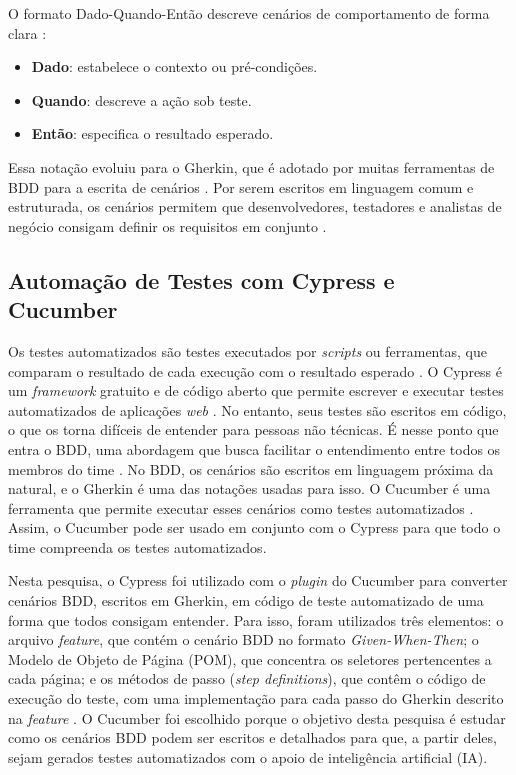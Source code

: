 O formato Dado-Quando-Então descreve cenários de comportamento de forma clara \cite{smart2014bdd}:

\begin{itemize}
    \item \textbf{Dado}: estabelece o contexto ou pré-condições.
    \item \textbf{Quando}: descreve a ação sob teste.
    \item \textbf{Então}: especifica o resultado esperado.
\end{itemize}

Essa notação evoluiu para o Gherkin, que é adotado por muitas ferramentas de BDD para a escrita de cenários \cite{smart2014bdd}. Por serem escritos em linguagem comum e estruturada, os cenários permitem que desenvolvedores, testadores e analistas de negócio consigam definir os requisitos em conjunto \cite{smart2014bdd}.

\subsection{Automação de Testes com Cypress e Cucumber}

Os testes automatizados são testes executados por \textit{scripts} ou ferramentas, que comparam o resultado de cada execução com o resultado esperado \cite{iso29119_1_2022}. O Cypress é um \textit{framework} gratuito e de código aberto que permite escrever e executar testes automatizados de aplicações \textit{web} \cite{cypressdocs}. No entanto, seus testes são escritos em código, o que os torna difíceis de entender para pessoas não técnicas. É nesse ponto que entra o BDD, uma abordagem que busca facilitar o entendimento entre todos os membros do time \cite{smart2014bdd}. No BDD, os cenários são escritos em linguagem próxima da natural, e o Gherkin é uma das notações usadas para isso. O Cucumber é uma ferramenta que permite executar esses cenários como testes automatizados \cite{cucumberdocs}. Assim, o Cucumber pode ser usado em conjunto com o Cypress para que todo o time compreenda os testes automatizados.

Nesta pesquisa, o Cypress foi utilizado com o \textit{plugin} do Cucumber para converter cenários BDD, escritos em Gherkin, em código de teste automatizado de uma forma que todos consigam entender. Para isso, foram utilizados três elementos: o arquivo \textit{feature}, que contém o cenário BDD no formato \textit{Given-When-Then}; o Modelo de Objeto de Página (POM), que concentra os seletores pertencentes a cada página; e os métodos de passo (\textit{step definitions}), que contêm o código de execução do teste, com uma implementação para cada passo do Gherkin descrito na \textit{feature} \cite{Nettur2025}. O Cucumber foi escolhido porque o objetivo desta pesquisa é estudar como os cenários BDD podem ser escritos e detalhados para que, a partir deles, sejam gerados testes automatizados com o apoio de inteligência artificial (IA).


